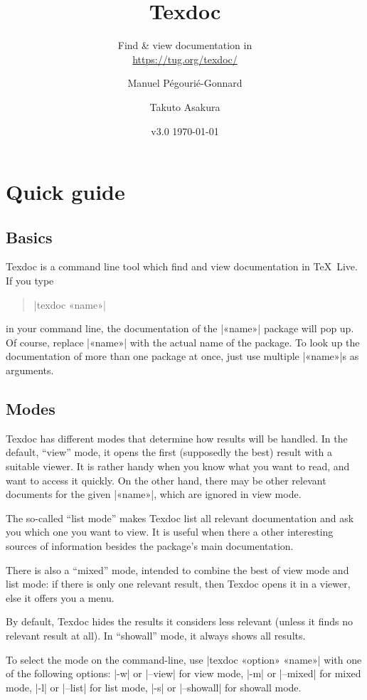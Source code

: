 \documentclass[a4paper, oneside]{scrartcl}
\title{Texdoc}
\subtitle{Find \& view documentation in \texlive\\
  \href{https://tug.org/texdoc/}{https://tug.org/texdoc/}}
\author{Manuel Pégourié-Gonnard\and Takuto Asakura}
\date{v3.0 \today}
\newcommand\texlive{\TeX~Live\xspace}
\begin{document}
\VerbatimFootnotes

\maketitle

\section{Quick guide}

\subsection{Basics}

Texdoc is a command line tool which find and view documentation in \texlive.
If you type
%
\begin{quote}
|texdoc «name»|
\end{quote}
%
in your command line, the documentation of the |«name»| package will pop up. Of
course, replace |«name»| with the actual name of the package.  To look up the
documentation of more than one package at once, just use multiple |«name»|s as
arguments.

\subsection{Modes}\label{ss-modes}

Texdoc has different modes that determine how results will be handled. In the
default, ``view'' mode, it opens the first (supposedly the best) result with a
suitable viewer. It is rather handy when you know what you want to read, and
want to access it quickly. On the other hand, there may be other relevant
documents for the given |«name»|, which are ignored in view mode.

The so-called ``list mode'' makes Texdoc list all relevant documentation and
ask you which one you want to view. It is useful when there a other
interesting sources of information besides the package's main documentation.

There is also a ``mixed'' mode, intended to combine the best of view mode and
list mode: if there is only one relevant result, then Texdoc opens it in a
viewer, else it offers you a menu.

By default, Texdoc hides the results it considers less relevant (unless it
finds no relevant result at all). In ``showall'' mode, it always shows all
results.

To select the mode on the command-line, use |texdoc «option» «name»| with one
of the following options: |-w| or |--view| for view mode, |-m| or |--mixed|
for mixed mode, |-l| or |--list| for list mode, |-s| or |--showall| for
showall mode.
\end{document}

